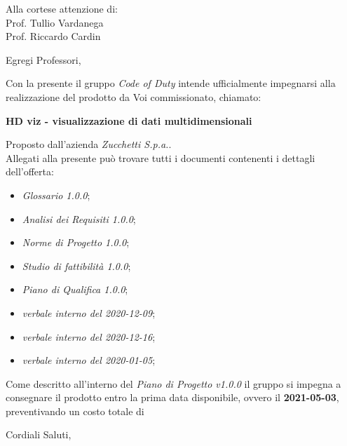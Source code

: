 \documentclass[11pt]{letter}
\begin{document}
\begin{letter}{Alla cortese attenzione di: \\ Prof. Tullio Vardanega \\ Prof. Riccardo Cardin}
\date{8 Gennaio, 2021}
\opening{Egregi Professori,}
Con la presente il gruppo \textit{Code of Duty} intende ufficialmente impegnarsi alla realizzazione del prodotto da Voi commissionato, chiamato:
\begin{center}
    \textbf{HD viz -  visualizzazione di dati multidimensionali}
\end{center}
Proposto dall'azienda \textit{Zucchetti S.p.a.}.\\
Allegati alla presente può trovare tutti i documenti contenenti i dettagli dell'offerta:
\begin{itemize}
    \item \textit{Glossario 1.0.0};
    \item \textit{Analisi dei Requisiti 1.0.0};
    \item \textit{Norme di Progetto 1.0.0};
    \item \textit{Studio di fattibilità 1.0.0};
    \item \textit{Piano di Qualifica 1.0.0};
    \item \textit{verbale interno del 2020-12-09};
    \item \textit{verbale interno del 2020-12-16};
    \item \textit{verbale interno del 2020-01-05};
\end{itemize}
Come descritto all'interno del \textit{Piano di Progetto v1.0.0} il gruppo si impegna a consegnare il prodotto entro la prima data disponibile, ovvero il \textbf{2021-05-03}, preventivando un costo totale di \textbf{}
\closing{Cordiali Saluti,}
\end{letter}
\end{document}
